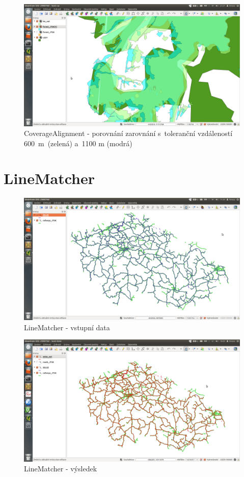   \begin{figure}[H]
    \centering
      \includegraphics[width=400pt]{./pictures/test-ca4.png}
      \caption[CoverageAlignment- porovnání]{CoverageAlignment 
	- porovnání zarovnání s~toleranční vzdáleností 600~m~(zelená)
	a~1100 m (modrá)}
      \label{fig:ca4}
  \end{figure}

\section{LineMatcher}
\label{ukazky-lm}

  \begin{figure}[H]
    \centering
      \includegraphics[width=400pt]{./pictures/test-lm1.png}
      \caption{LineMatcher - vstupní data}
      \label{fig:lm1}
  \end{figure}

  \begin{figure}[H]
    \centering
      \includegraphics[width=400pt]{./pictures/test-lm2.png}
      \caption{LineMatcher - výsledek}
      \label{fig:lm2}
  \end{figure}  

